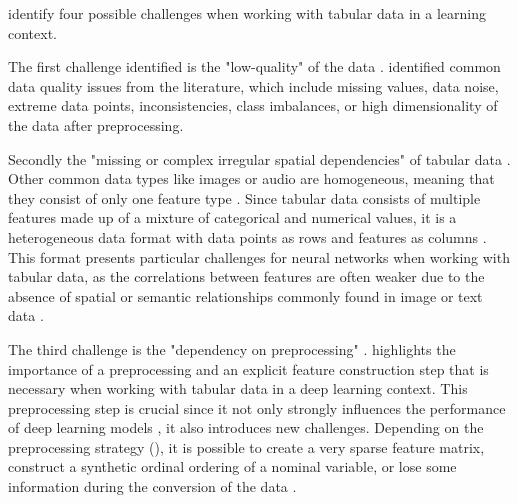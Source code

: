 \textcite{borisov2022DeepNeuralNetworks} identify four possible challenges when working with tabular data in a learning context.

The first challenge identified is the "low-quality" of the data \cite[p. 4]{borisov2022DeepNeuralNetworks}. 
\textcite{borisov2022DeepNeuralNetworks} identified common data quality issues from the literature, which include missing values, data noise, extreme data points, inconsistencies, class imbalances, or high dimensionality of the data after preprocessing.

Secondly the "missing or complex irregular spatial dependencies" of tabular data \cite[p. 4]{borisov2022DeepNeuralNetworks}. 
Other common data types like images or audio are homogeneous, meaning that they consist of only one feature type \cite{borisov2022DeepNeuralNetworks}.
Since tabular data consists of multiple features made up of a mixture of categorical and numerical values, it is a heterogeneous data format with data points as rows and features as columns \cite{borisov2022DeepNeuralNetworks}.
This format presents particular challenges for neural networks when working with tabular data, as the correlations between features are often weaker due to the absence of spatial or semantic relationships commonly found in image or text data \cite{borisov2022DeepNeuralNetworks, yoon2020VIMEExtendingSuccess}.

The third challenge is the "dependency on preprocessing" \cite[p. 4]{borisov2022DeepNeuralNetworks}. 
\textcite{borisov2022DeepNeuralNetworks} highlights the importance of a preprocessing and an explicit feature construction step that is necessary when working with tabular data in a deep learning context.
This preprocessing step is crucial since it not only strongly influences the performance of deep learning models \cite{gorishniy2022EmbeddingsNumericalFeatures}, it also introduces new challenges. 
Depending on the preprocessing strategy (), it is possible to create a very sparse feature matrix, construct a synthetic ordinal ordering of a nominal variable, or lose some information during the conversion of the data \cite{borisov2022DeepNeuralNetworks}.

